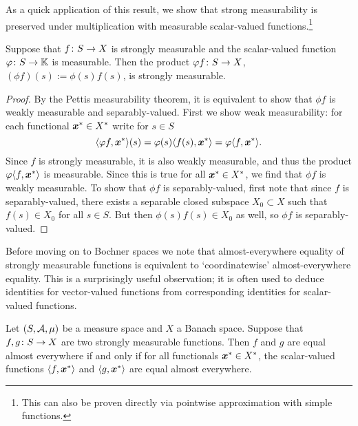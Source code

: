 As a quick application of this result, we show that strong measurability is preserved under multiplication with measurable scalar-valued functions.\footnote{This can also be proven directly via pointwise approximation with simple functions.}

\begin{cor}\label{cor:strong-meas-meas-mult}
  Suppose that $f \colon S \rightarrow X$ is strongly measurable and the scalar-valued function $\varphi \colon S \rightarrow \mathbb{K}$ is measurable.
  Then the product $\varphi f \colon S \rightarrow X$, $(\phi f)(s) := \phi(s)f(s)$, is strongly measurable.
\end{cor}

\begin{proof}
  By the Pettis measurability theorem, it is equivalent to show that $\phi f$ is weakly measurable and separably-valued. 
  First we show weak measurability: for each functional $\bm{x}^* \in X^*$ write for $s \in S$
  \begin{equation*}
    \langle \varphi f, \bm{x}^* \rangle(s) = \varphi(s) \langle f(s) , \bm{x}^* \rangle = \varphi \langle f, \bm{x}^* \rangle.
  \end{equation*}
  Since $f$ is strongly measurable, it is also weakly measurable, and thus the product $\varphi \langle f, \bm{x}^* \rangle$ is measurable.
  Since this is true for all $\bm{x}^* \in X^*$, we find that $\phi f$ is weakly measurable.
  To show that $\phi f$ is separably-valued, first note that since $f$ is separably-valued, there exists a separable closed subspace $X_0 \subset X$ such that $f(s) \in X_0$ for all $s \in S$.
  But then $\phi(s)f(s) \in X_0$ as well, so $\phi f$ is separably-valued.
\end{proof}

Before moving on to Bochner spaces we note that almost-everywhere equality of strongly measurable functions is equivalent to `coordinatewise' almost-everywhere equality.
This is a surprisingly useful observation; it is often used to deduce identities for vector-valued functions from corresponding identities for scalar-valued functions.

\begin{lem}\label{lem:coordinatewise-equality-test}
  Let $(S,\mathcal{A},\mu)$ be a measure space and $X$ a Banach space.
  Suppose that $f,g \colon S \rightarrow X$ are two strongly measurable functions.
  Then $f$ and $g$ are equal almost everywhere if and only if for all functionals $\bm{x}^* \in X^*$, the scalar-valued functions $\langle f, \bm{x}^*\rangle$ and $\langle g, \bm{x}^* \rangle$ are equal almost everywhere.
\end{lem}

